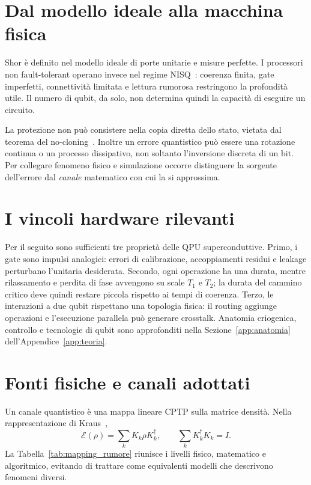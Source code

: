 \begin{onehalfspace}

\section{Dal modello ideale alla macchina fisica}

Shor è definito nel modello ideale di porte unitarie e misure perfette. I processori non fault-tolerant operano invece nel regime \ac{NISQ}~\cite{preskill2018}: coerenza finita, gate imperfetti, connettività limitata e lettura rumorosa restringono la profondità utile. Il numero di qubit, da solo, non determina quindi la capacità di eseguire un circuito.

La protezione non può consistere nella copia diretta dello stato, vietata dal teorema del no-cloning~\cite{wootters1982}. Inoltre un errore quantistico può essere una rotazione continua o un processo dissipativo, non soltanto l'inversione discreta di un bit. Per collegare fenomeno fisico e simulazione occorre distinguere la sorgente dell'errore dal \emph{canale} matematico con cui la si approssima.

\section{I vincoli hardware rilevanti}
\label{sec:anatomia_qpu}

Per il seguito sono sufficienti tre proprietà delle \ac{QPU} superconduttive. Primo, i gate sono impulsi analogici: errori di calibrazione, accoppiamenti residui e leakage perturbano l'unitaria desiderata. Secondo, ogni operazione ha una durata, mentre rilassamento e perdita di fase avvengono su scale $T_1$ e $T_2$; la durata del cammino critico deve quindi restare piccola rispetto ai tempi di coerenza. Terzo, le interazioni a due qubit rispettano una topologia fisica: il routing aggiunge operazioni e l'esecuzione parallela può generare crosstalk. Anatomia criogenica, controllo e tecnologie di qubit sono approfonditi nella Sezione~\ref{app:anatomia} dell'Appendice~\ref{app:teoria}.

\section{Fonti fisiche e canali adottati}
\label{sec:fonti_fisiche}
\label{sec:canali}

Un canale quantistico è una mappa lineare \acf{CPTP} sulla matrice densità. Nella rappresentazione di Kraus~\cite{nielsenChuang2000},
\begin{equation}
    \mathcal{E}(\rho)=\sum_k K_k\rho K_k^\dagger,
    \qquad \sum_k K_k^\dagger K_k=I.
    \label{eq:kraus}
\end{equation}
La Tabella~\ref{tab:mapping_rumore} riunisce i livelli fisico, matematico e algoritmico, evitando di trattare come equivalenti modelli che descrivono fenomeni diversi.


\end{onehalfspace}
